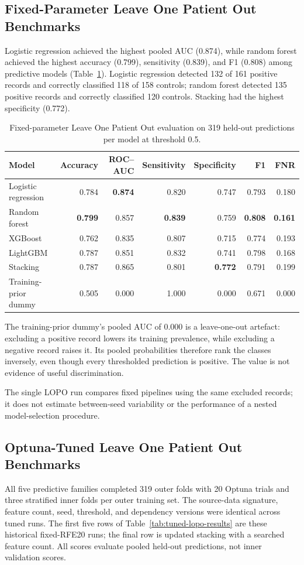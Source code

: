 \subsection{Fixed-Parameter Leave One Patient Out Benchmarks}
Logistic regression achieved the highest pooled AUC (0.874), while random forest achieved the highest accuracy (0.799), sensitivity (0.839), and F1 (0.808) among predictive models (Table~\ref{tab:building-lopo-results}). Logistic regression detected 132 of 161 positive records and correctly classified 118 of 158 controls; random forest detected 135 positive records and correctly classified 120 controls. Stacking had the highest specificity (0.772).

\begin{table}[t]
\centering
\footnotesize
\caption{Fixed-parameter Leave One Patient Out evaluation on 319 held-out predictions per model at threshold 0.5.}
\label{tab:building-lopo-results}
\begin{tabular}{@{}lrrrrrr@{}}
\toprule
Model & Accuracy & ROC--AUC & Sensitivity & Specificity & F1 & FNR \\
\midrule
Logistic regression & 0.784 & \textbf{0.874} & 0.820 & 0.747 & 0.793 & 0.180 \\
Random forest & \textbf{0.799} & 0.857 & \textbf{0.839} & 0.759 & \textbf{0.808} & \textbf{0.161} \\
XGBoost & 0.762 & 0.835 & 0.807 & 0.715 & 0.774 & 0.193 \\
LightGBM & 0.787 & 0.851 & 0.832 & 0.741 & 0.798 & 0.168 \\
Stacking & 0.787 & 0.865 & 0.801 & \textbf{0.772} & 0.791 & 0.199 \\
\midrule
Training-prior dummy & 0.505 & 0.000 & 1.000 & 0.000 & 0.671 & 0.000 \\
\bottomrule
\end{tabular}
\end{table}
The training-prior dummy's pooled AUC of 0.000 is a leave-one-out artefact: excluding a positive record lowers its training prevalence, while excluding a negative record raises it. Its pooled probabilities therefore rank the classes inversely, even though every thresholded prediction is positive. The value is not evidence of useful discrimination.

The single LOPO run compares fixed pipelines using the same excluded records; it does not estimate between-seed variability or the performance of a nested model-selection procedure.

\subsection{Optuna-Tuned Leave One Patient Out Benchmarks}
All five predictive families completed 319 outer folds with 20 Optuna trials and three stratified inner folds per outer training set. The source-data signature, feature count, seed, threshold, and dependency versions were identical across tuned runs. The first five rows of Table~\ref{tab:tuned-lopo-results} are these historical fixed-RFE20 runs; the final row is updated stacking with a searched feature count. All scores evaluate pooled held-out predictions, not inner validation scores.

